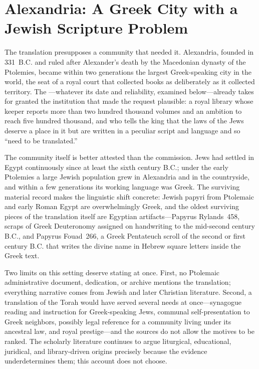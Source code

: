 \section{Alexandria: A Greek City with a Jewish Scripture Problem}

The translation presupposes a community that needed it. Alexandria, founded
in 331~B.C. and ruled after Alexander's death by the Macedonian dynasty of
the Ptolemies, became within two generations the largest Greek-speaking city
in the world, the seat of a royal court that collected books as deliberately
as it collected territory. The ---whatever its date
and reliability, examined below---already takes for granted the institution
that made the request plausible: a royal library whose keeper reports more
than two hundred thousand volumes and an ambition to reach five hundred
thousand, and who tells the king that the laws of the Jews deserve a
place in it but are written in a peculiar script and language and so ``need
to be translated.''

The community itself is better attested than the commission. Jews had
settled in Egypt continuously since at least the sixth century B.C.; under
the early Ptolemies a large Jewish population grew in Alexandria and in the
countryside, and within a few generations its working language was Greek.
The surviving material record makes the linguistic shift concrete: Jewish
papyri from Ptolemaic and early Roman Egypt are overwhelmingly Greek, and the
oldest surviving pieces of the translation itself are Egyptian
artifacts---Papyrus Rylands~458, scraps of Greek Deuteronomy assigned on
handwriting to the mid-second century B.C., and Papyrus Fouad~266, a Greek
Pentateuch scroll of the second or first century B.C. that writes the divine
name in Hebrew square letters inside the Greek text.

Two limits on this setting deserve stating at once. First, no Ptolemaic
administrative document, dedication, or archive mentions the translation;
everything narrative comes from Jewish and later Christian literature.
Second, a translation of the Torah would have served several needs at
once---synagogue reading and instruction for Greek-speaking Jews, communal
self-presentation to Greek neighbors, possibly legal reference for a
community living under its ancestral law, and royal prestige---and the
sources do not allow the motives to be ranked. The scholarly literature
continues to argue liturgical, educational, juridical, and library-driven
origins precisely because the evidence underdetermines them; this account
does not choose.
